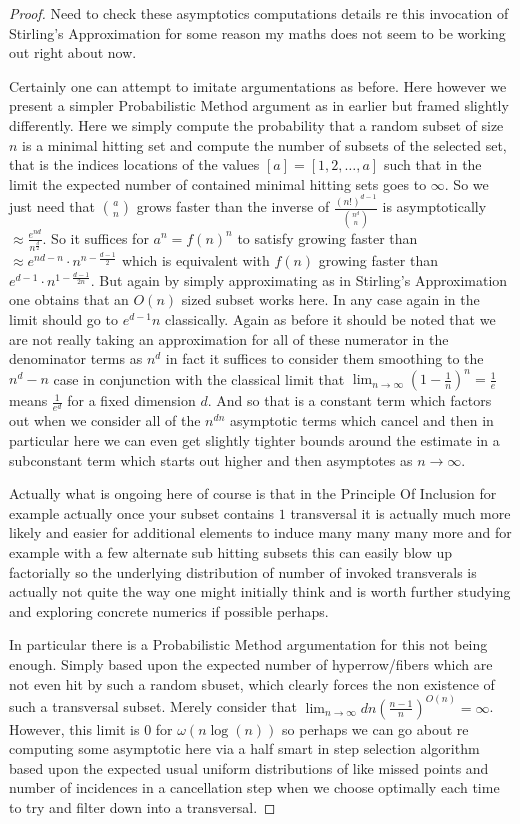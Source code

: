 \documentclass[12pt]{article}
\begin{document}
\begin{proof}
	Need to check these asymptotics computations details re this invocation of Stirling's Approximation for some reason my maths does not seem to be working out right about now.
	
	Certainly one can attempt to imitate argumentations as before. Here however we present a simpler Probabilistic Method argument as in earlier but framed slightly differently. Here we simply compute the probability that a random subset of size $n$ is a minimal hitting set and compute the number of subsets of the selected set, that is the indices locations of the values $[a] = [1,2,\dots,a]$ such that in the limit the expected number of contained minimal hitting sets goes to $\infty$. So we just need that $\binom{a}{n}$ grows faster than the inverse of $\frac{(n!)^{d-1}}{\binom{n^d}{n}}$ is asymptotically $\approx \frac{e^{nd}}{n^{\frac{d}{2}}}$. So it suffices for $a^n = f(n)^n$ to satisfy growing faster than $\approx e^{nd-n} \cdot n^{n-\frac{d-1}{2}}$ which is equivalent with $f(n)$ growing faster than $e^{d-1} \cdot n^{1-\frac{d-1}{2n}}$. But again by simply approximating as in Stirling's Approximation one obtains that an $O(n)$ sized subset works here. In any case again in the limit should go to $e^{d-1} n$ classically. Again as before it should be noted that we are not really taking an approximation for all of these numerator in the denominator terms as $n^d$ in fact it suffices to consider them smoothing to the $n^d-n$ case in conjunction with the classical limit that $\lim_{n \to \infty} \left( 1-\frac{1}{n} \right)^n = \frac{1}{e}$ means $\frac{1}{e^d}$ for a fixed dimension $d$. And so that is a constant term which factors out when we consider all of the $n^{dn}$ asymptotic terms which cancel and then in particular here we can even get slightly tighter bounds around the estimate in a subconstant term which starts out higher and then asymptotes as $n \to \infty$.

	Actually what is ongoing here of course is that in the Principle Of Inclusion for example actually once your subset contains $1$ transversal it is actually much more likely and easier for additional elements to induce many many many more and for example with a few alternate sub hitting subsets this can easily blow up factorially so the underlying distribution of number of invoked transverals is actually not quite the way one might initially think and is worth further studying and exploring concrete numerics if possible perhaps.

	In particular there is a Probabilistic Method argumentation for this not being enough. Simply based upon the expected number of hyperrow/fibers which are not even hit by such a random sbuset, which clearly forces the non existence of such a transversal subset. Merely consider that $\lim_{n \to \infty} d n \left( \frac{n-1}{n} \right)^{O(n)} = \infty$. However, this limit is $0$ for $\omega(n \log(n))$ so perhaps we can go about re computing some asymptotic here via a half smart in step selection algorithm based upon the expected usual uniform distributions of like missed points and number of incidences in a cancellation step when we choose optimally each time to try and filter down into a transversal.
\end{proof}
\end{document}
